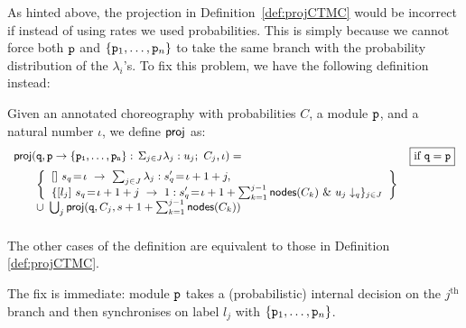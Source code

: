     As hinted above, the projection in Definition~\ref{def:projCTMC}
    would be incorrect if instead of using rates we used
    probabilities. This is simply because we cannot force both
    $\mathtt{p}$ and $\{\mathtt{p}_1,\ldots,\mathtt{p}_n\}$ to take the same
    branch with the probability distribution of the $\lambda_i$'s. To
    fix this problem, we have the following definition instead:
    \begin{definition}\label{def:projDTMC} Given an annotated
      choreography with probabilities $C$, a module $\mathtt{p}$, and a
      natural number $\iota$, we define $\mathsf{proj}$ as:
      \begin{displaymath}\small
        \begin{array}{lr}

          \proj (\role q,\interact{p}{\role p_1,\ldots,\role p_n}, \iota)= 
          &  \boxed{\text{if }\role q=\role p}\\[2mm]
          \qquad
          \left\{
          \begin{array}{lll}
            \commandBase {} {s_{q}\!=\! \iota}{\ \sum_{j\in J} \lambda_j: s'_{q}\!=\! \iota+1+j},\\ 
            \{\commandBase {l_j} {s_{q}\!=\! \iota+1+j}
            \ 1: s'_{q}\!=\! \iota+1+\sum_{k=1}^{j-1}\mathsf{nodes}({C_k})\ \&\ \projE
            {u_j}q\}_{j\in J}
          \end{array}
          \right\}
          \\
          \qquad\cup\ \bigcup_{j} \proj (\role q, C_j, s+1+\sum_{k=1}^{j-1}\mathsf{nodes}({C_k}))
          \\\\

        \end{array}
      \end{displaymath}
      The other cases of the definition are equivalent to those in
      Definition \ref{def:projCTMC}.
    \end{definition}
    The fix is immediate: module $\mathtt{p}$ takes a (probabilistic)
    internal decision on the $j^{\text{th}}$ branch and then
    synchronises on label $l_j$ with $\{\mathtt{p}_1,\ldots,\mathtt{p}_n\}$.       

\smallskip


